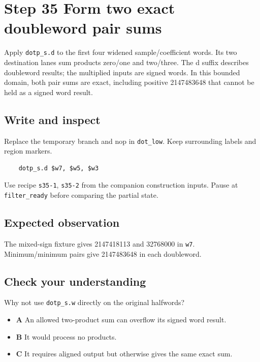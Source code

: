 \section{Step 35 Form two exact doubleword pair sums}\label{fir-s35}

Apply \texttt{dotp\_s.d} to the first four widened sample/coefficient words. Its two destination lanes sum products zero/one and two/three. The d suffix describes doubleword results; the multiplied inputs are signed words. In this bounded domain, both pair sums are exact, including positive 2147483648 that cannot be held as a signed word result.

\subsection{Write and inspect}
Replace the temporary branch and nop in \texttt{dot\_low}. Keep surrounding labels and region markers.

\begin{verbatim}
    dotp_s.d $w7, $w5, $w3
\end{verbatim}
Use recipe \texttt{s35-1}, \texttt{s35-2} from the companion construction inputs. Pause at \texttt{filter\_ready} before comparing the partial state.

\subsection{Expected observation}
The mixed-sign fixture gives 2147418113 and 32768000 in \texttt{w7}. Minimum/minimum pairs give 2147483648 in each doubleword.

\subsection{Check your understanding}
Why not use \texttt{dotp\_s.w} directly on the original halfwords?

\begin{itemize}
\item \textbf{A} An allowed two-product sum can overflow its signed word result.
\item \textbf{B} It would process no products.
\item \textbf{C} It requires aligned output but otherwise gives the same exact sum.
\end{itemize}

